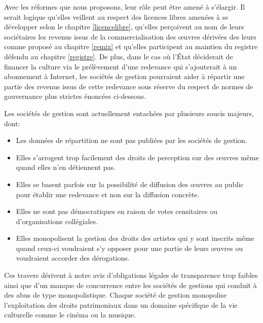 Avec les réformes que nous proposons, leur rôle peut être amené à s'élargir. Il serait logique qu'elles veillent au respect des licences libres amenées à se développer selon le chapitre \ref{licencelibre}, qu'elles perçoivent au nom de leurs sociétaires les revenus issus de la commercialisation des œuvres dérivées des leurs comme proposé au chapitre \ref{remix} et qu'elles participent au maintien du registre défendu au chapitre \ref{registre}. De plus, dans le cas où l'État déciderait de financer la culture via le prélèvement d'une redevance qui s'ajouterait à un abonnement à Internet, les sociétés de gestion pourraient aider à répartir une partie des revenus issus de cette redevance sous réserve du respect de normes de gouvernance plus strictes énoncées ci-dessous.

Les sociétés de gestion sont actuellement entachées par plusieurs soucis majeurs, dont:

\begin{itemize}
\item Les données de répartition ne sont pas publiées par les sociétés de gestion.
\item Elles s'arrogent trop facilement des droits de perception sur des œuvres même quand elles n'en détiennent pas.
\item Elles se basent parfois sur la possibilité de diffusion des œuvres au public pour établir une redevance et non sur la diffusion concrète.
\item Elles ne sont pas démocratiques en raison de votes censitaires ou d'organisations collégiales.
\item Elles monopolisent la gestion des droits des artistes qui y sont inscrits même quand ceux-ci voudraient s'y opposer pour une partie de leurs œuvres ou voudraient accorder des dérogations.
\end{itemize}

Ces travers dérivent à notre avis d'obligations légales de transparence trop faibles ainsi que d'un manque de concurrence entre les sociétés de gestions qui conduit à des abus de type monopolistique. Chaque société de gestion monopolise l'exploitation des droits patrimoniaux dans un domaine spécifique de la vie culturelle comme le cinéma ou la musique. 

